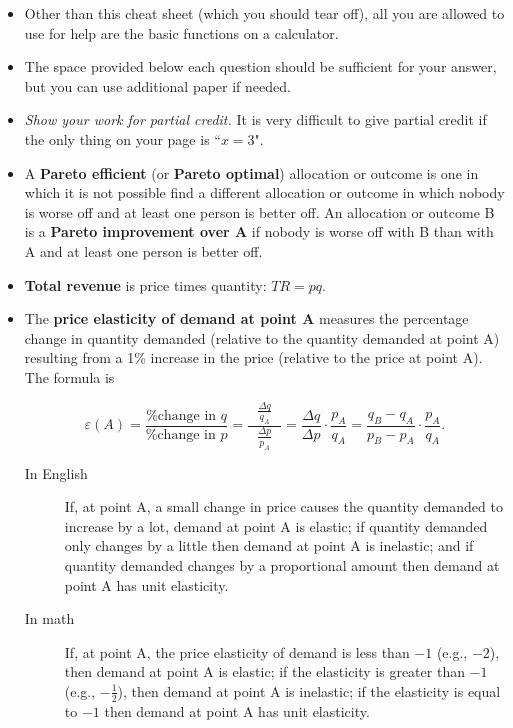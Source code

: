 \documentclass{article}
\begin{document}
\begin{EXAM}

\begin{itemize}

\item Other than this cheat sheet (which you should tear off), all you are allowed to use for help are the basic functions on a calculator. 

\item The space provided below each question should be sufficient for your answer, but you can use additional paper if needed. 

\item \emph{Show your work for partial credit.} It is very difficult to give partial credit if the only thing on your page is ``$x=3$".

\item A \textbf{Pareto efficient} (or \textbf{Pareto optimal}) allocation or outcome is one in which it is not possible find a different allocation or outcome in which nobody is worse off and at least one person is better off. An allocation or outcome B is a \textbf{Pareto improvement over A} if nobody is worse off with B than with A and at least one person is better off.

\item \textbf{Total revenue} is price times quantity: $TR = pq$.

\item The \textbf{price elasticity of demand at point A} measures the percentage change in quantity demanded (relative to the quantity demanded at point A) resulting from a 1\% increase in the price (relative to the price at point A). The formula is

\[
\varepsilon (A)=\frac{\mbox{\% change in } q}{\mbox{\% change in } p} = \displaystyle\frac{\ \ \ \displaystyle\frac{\Delta q}{q_A}\ \ \ }{\displaystyle\frac{\Delta p}{p_A}} =
\frac{\Delta q}{\Delta p}\cdot\frac{p_A}{q_A} =
\frac{q_B-q_A}{p_B-p_A}\cdot\frac{p_A}{q_A}.
\]


\begin{description}

\item [In English] If, at point A, a small change in price causes the quantity demanded to increase by a lot, demand at point A is elastic; if quantity demanded only changes by a little then demand at point A is inelastic; and if quantity demanded changes by a proportional amount then demand at point A has unit elasticity.

\item [In math] If, at point A, the price elasticity of demand is less than $-1$ (e.g., $-2$), then demand at point A is elastic; if the elasticity is greater than $-1$ (e.g., $-\frac{1}{2}$), then demand at point A is inelastic; if the elasticity is equal to $-1$ then demand at point A has unit elasticity.


\end{description}
\end{itemize}
\end{EXAM}
\end{document}
